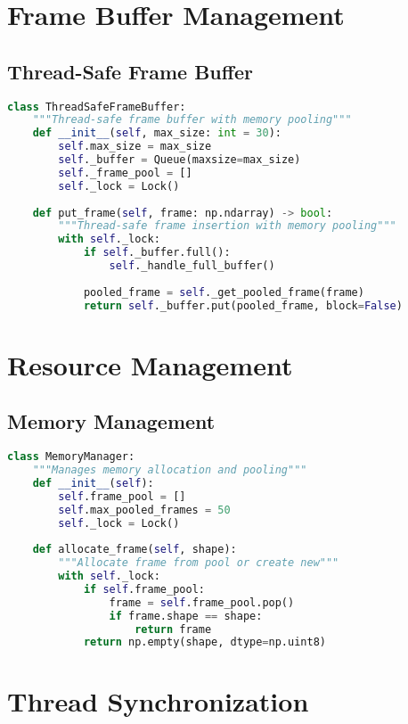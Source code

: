 \section{Frame Buffer Management}

\subsection{Thread-Safe Frame Buffer}
\begin{lstlisting}[language=Python]
class ThreadSafeFrameBuffer:
    """Thread-safe frame buffer with memory pooling"""
    def __init__(self, max_size: int = 30):
        self.max_size = max_size
        self._buffer = Queue(maxsize=max_size)
        self._frame_pool = []
        self._lock = Lock()
        
    def put_frame(self, frame: np.ndarray) -> bool:
        """Thread-safe frame insertion with memory pooling"""
        with self._lock:
            if self._buffer.full():
                self._handle_full_buffer()
            
            pooled_frame = self._get_pooled_frame(frame)
            return self._buffer.put(pooled_frame, block=False)
\end{lstlisting}

\section{Resource Management}

\subsection{Memory Management}
\begin{lstlisting}[language=Python]
class MemoryManager:
    """Manages memory allocation and pooling"""
    def __init__(self):
        self.frame_pool = []
        self.max_pooled_frames = 50
        self._lock = Lock()
        
    def allocate_frame(self, shape):
        """Allocate frame from pool or create new"""
        with self._lock:
            if self.frame_pool:
                frame = self.frame_pool.pop()
                if frame.shape == shape:
                    return frame
            return np.empty(shape, dtype=np.uint8)
\end{lstlisting}

\section{Thread Synchronization}

